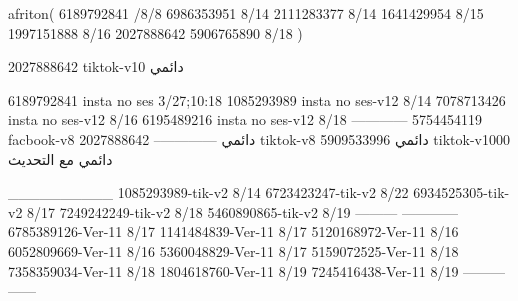 afriton(
6189792841 /8/8
6986353951 8/14
2111283377 8/14
1641429954 8/15
1997151888 8/16
2027888642
5906765890 8/18
)

2027888642 tiktok-v10
دائمي

6189792841 insta no ses
3/27;10:18
1085293989 insta no ses-v12
8/14
7078713426 insta no ses-v12
8/16
6195489216 insta no ses-v12
8/18
------------
5754454119 facbook-v8
دائمي
--------------
2027888642 tiktok-v8
دائمي
5909533996 tiktok-v1000
دائمي مع التحديث

__________
1085293989-tik-v2
8/14
6723423247-tik-v2
8/22
6934525305-tik-v2
8/17
7249242249-tik-v2
8/18
5460890865-tik-v2
8/19
---------
------------
6785389126-Ver-11
8/17
1141484839-Ver-11
8/17
5120168972-Ver-11
8/16
6052809669-Ver-11
8/16
5360048829-Ver-11
8/17
5159072525-Ver-11
8/18
7358359034-Ver-11
8/18
1804618760-Ver-11
8/19
7245416438-Ver-11
8/19
---------
------
